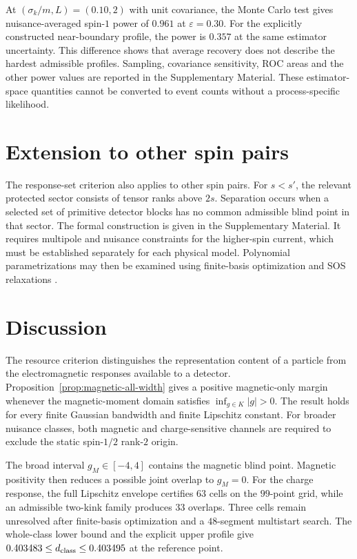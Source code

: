 \documentclass[12pt]{iopjournal}
\theoremstyle{definition}
\theoremstyle{remark}
\begin{document}
At $(\sigma_k/m,L)=(0.10,2)$ with unit covariance, the Monte Carlo test gives nuisance-averaged spin-$1$ power of $0.961$ at $\varepsilon=0.30$. For the explicitly constructed near-boundary profile, the power is $0.357$ at the same estimator uncertainty. This difference shows that average recovery does not describe the hardest admissible profiles. Sampling, covariance sensitivity, ROC areas and the other power values are reported in the Supplementary Material. These estimator-space quantities cannot be converted to event counts without a process-specific likelihood.

\section{Extension to other spin pairs}
\label{sec:computational}

The response-set criterion also applies to other spin pairs. For $s<s'$, the relevant protected sector consists of tensor ranks above $2s$. Separation occurs when a selected set of primitive detector blocks has no common admissible blind point in that sector. The formal construction is given in the Supplementary Material. It requires multipole and nuisance constraints for the higher-spin current, which must be established separately for each physical model. Polynomial parametrizations may then be examined using finite-basis optimization and SOS relaxations \cite{Lasserre2001,Parrilo2003}.

\section{Discussion}
\label{sec:discussion}

The resource criterion distinguishes the representation content of a particle from the electromagnetic responses available to a detector. Proposition~\ref{prop:magnetic-all-width} gives a positive magnetic-only margin whenever the magnetic-moment domain satisfies $\inf_{g\in K}|g|>0$. The result holds for every finite Gaussian bandwidth and finite Lipschitz constant. For broader nuisance classes, both magnetic and charge-sensitive channels are required to exclude the static spin-$1/2$ rank-$2$ origin.

The broad interval $g_M\in[-4,4]$ contains the magnetic blind point. Magnetic positivity then reduces a possible joint overlap to $g_M=0$. For the charge response, the full Lipschitz envelope certifies 63 cells on the $99$-point grid, while an admissible two-kink family produces 33 overlaps. Three cells remain unresolved after finite-basis optimization and a $48$-segment multistart search. The whole-class lower bound and the explicit upper profile give $0.403483\le d_{\rm class}\le0.403495$ at the reference point.
\end{document}
